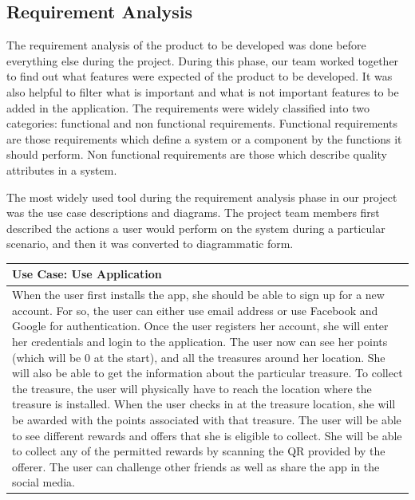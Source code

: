 \documentclass[12pt, a4paper, oneside]{article}
\begin{document}
\subsection{Requirement Analysis}
The requirement analysis of the product to be developed was done before everything else during the project. During this phase, our team worked together to find out what features were expected of the product to be developed. It was also helpful to filter what is important and what is not important features to be added in the application. The requirements were widely classified into two categories: functional and non functional requirements. Functional requirements are those requirements which define a system or a component by the functions it should perform. Non functional requirements are those which describe quality attributes in a system.

The most widely used tool during the requirement analysis phase in our project was the use case descriptions and diagrams. The project team members first described the actions a user would perform on the system during a particular scenario, and then it was converted to diagrammatic form. 


\begin{table}[h!]
\centering
\begin{tabularx}{\linewidth}{|X|} 
\hline
\textbf{Use Case:  Use Application}\\ 
\hline
When the user first installs the app, she should be able to sign up for a new account. For so, the user can either use email address or use Facebook and Google for authentication. Once the user registers her account, she will enter her credentials and login to the application. The user now can see her points (which will be 0 at the start), and all the treasures around her location. She will also be able to get the information about the particular treasure. To collect the treasure, the user will physically have to reach the location where the treasure is installed. When the user checks in at the treasure location, she will be awarded with the points associated with that treasure. The user will be able to see different rewards and offers that she is eligible to collect. She will be able to collect any of the permitted rewards by scanning the QR provided by the offerer. The user can challenge other friends as well as share the app in the social media.\\
\hline
\end{tabularx}
\end{table}
\end{document}
